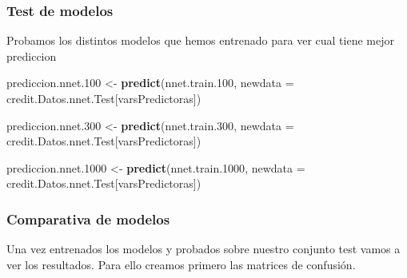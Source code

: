 \documentclass[
]{article}
\newenvironment{Shaded}{\begin{snugshade}}{\end{snugshade}}
\newcommand{\AttributeTok}[1]{\textcolor[rgb]{0.13,0.29,0.53}{#1}}
\newcommand{\FloatTok}[1]{\textcolor[rgb]{0.00,0.00,0.81}{#1}}
\newcommand{\FunctionTok}[1]{\textcolor[rgb]{0.13,0.29,0.53}{\textbf{#1}}}
\newcommand{\NormalTok}[1]{#1}
\newcommand{\OtherTok}[1]{\textcolor[rgb]{0.56,0.35,0.01}{#1}}
\begin{document}
\hypertarget{test-de-modelos-1}{%
\subsubsection{Test de modelos}\label{test-de-modelos-1}}

Probamos los distintos modelos que hemos entrenado para ver cual tiene
mejor prediccion

\begin{Shaded}
\begin{Highlighting}[]
\NormalTok{prediccion.nnet}\FloatTok{.100} \OtherTok{\textless{}{-}} \FunctionTok{predict}\NormalTok{(nnet.train}\FloatTok{.100}\NormalTok{, }\AttributeTok{newdata =}\NormalTok{ credit.Datos.nnet.Test[varsPredictoras])}

\NormalTok{prediccion.nnet}\FloatTok{.300} \OtherTok{\textless{}{-}} \FunctionTok{predict}\NormalTok{(nnet.train}\FloatTok{.300}\NormalTok{, }\AttributeTok{newdata =}\NormalTok{ credit.Datos.nnet.Test[varsPredictoras])}

\NormalTok{prediccion.nnet}\FloatTok{.1000} \OtherTok{\textless{}{-}} \FunctionTok{predict}\NormalTok{(nnet.train}\FloatTok{.1000}\NormalTok{, }\AttributeTok{newdata =}\NormalTok{ credit.Datos.nnet.Test[varsPredictoras])}
\end{Highlighting}
\end{Shaded}

\hypertarget{comparativa-de-modelos-1}{%
\subsubsection{Comparativa de modelos}\label{comparativa-de-modelos-1}}

Una vez entrenados los modelos y probados sobre nuestro conjunto test
vamos a ver los resultados. Para ello creamos primero las matrices de
confusión.
\end{document}
